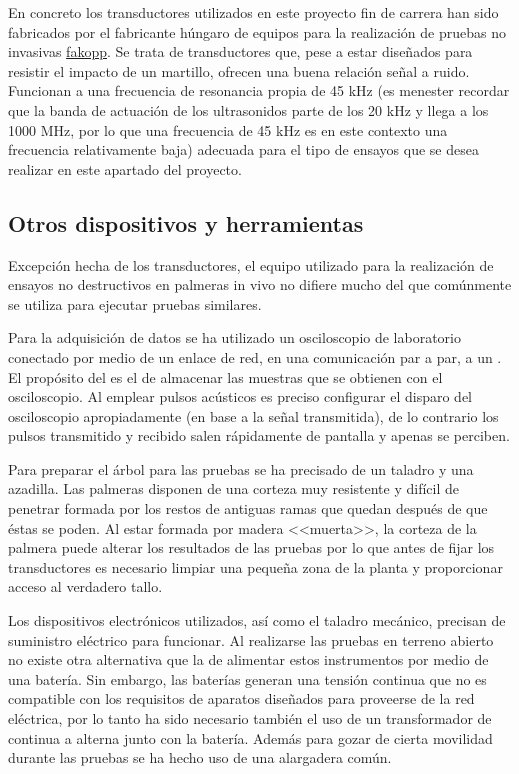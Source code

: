 En concreto los transductores utilizados en este proyecto fin de carrera
han sido fabricados por el fabricante húngaro de equipos para la
realización de pruebas no invasivas
\href{http://www.fakopp.com/site/piezo}{fakopp}. Se trata de transductores que,
pese a estar diseñados para resistir el impacto de un martillo, ofrecen una
buena relación señal a ruido. Funcionan a una frecuencia de resonancia
propia de 45 kHz (es menester recordar que la banda de actuación de los
ultrasonidos parte de los 20 kHz y llega a los 1000 MHz, por lo que una
frecuencia de 45 kHz es en este contexto una frecuencia relativamente
baja) adecuada para el tipo de ensayos que se desea realizar en este
apartado del proyecto.


\subsection{Otros dispositivos y herramientas}

Excepción hecha de los transductores, el equipo utilizado para la realización de
ensayos no destructivos en palmeras in vivo no difiere mucho del que
comúnmente se utiliza para ejecutar pruebas similares.

Para la adquisición de datos se ha utilizado un osciloscopio de laboratorio
conectado por medio de un enlace de red, en una comunicación par a par, a
un . El propósito del  es el de almacenar las muestras que
se obtienen con el osciloscopio. Al emplear pulsos acústicos es preciso
configurar el disparo del osciloscopio apropiadamente (en base a la señal
transmitida), de lo contrario los pulsos transmitido y recibido salen
rápidamente de pantalla y apenas se perciben.

Para preparar el árbol para las pruebas se ha precisado de un taladro y una
azadilla. Las palmeras disponen de una corteza muy resistente y difícil de
penetrar formada por los restos de antiguas ramas que quedan después de que
éstas se poden. Al estar formada por madera <<muerta>>, la corteza de la
palmera puede alterar los resultados de las pruebas por lo que antes de
fijar los transductores es necesario limpiar una pequeña zona de la planta
y proporcionar acceso al verdadero tallo.

Los dispositivos electrónicos utilizados, así como el taladro mecánico,
precisan de suministro eléctrico para funcionar. Al realizarse las pruebas
en terreno abierto no existe otra alternativa que la de alimentar estos
instrumentos por medio de una batería. Sin embargo, las baterías generan
una tensión continua que no es compatible con los requisitos de aparatos
diseñados para proveerse de la red eléctrica, por lo tanto ha sido
necesario también el uso de un transformador de continua a alterna junto
con la batería. Además para gozar de cierta movilidad durante las pruebas
se ha hecho uso de una alargadera común.

